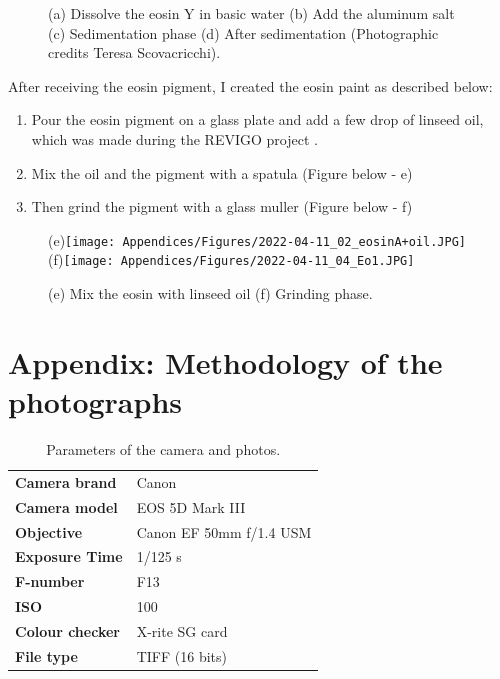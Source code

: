 \begin{appendices}
\begin{figure}[!h]
  \caption*{(a) Dissolve the eosin Y in basic water (b) Add the aluminum salt (c) Sedimentation phase (d) After sedimentation (Photographic credits Teresa Scovacricchi).}
 
\end{figure}


\vspace{1.5cm}

After receiving the eosin pigment, I created the eosin paint as described below:
\begin{enumerate}
\item Pour the eosin pigment on a glass plate and add a few drop of linseed oil, which was made during the \gls{REVIGO} project \citep{geldof_reconstructing_2018}. 
\item Mix the oil and the pigment with a spatula (Figure below - e)
\item Then grind the pigment with a glass muller (Figure below - f)
\end{enumerate} 


\begin{figure}[!h]
  \centering
  
  \subfigure(e){\texttt{[image: Appendices/Figures/2022-04-11\_02\_eosinA+oil.JPG]}} 
  \subfigure(f){\texttt{[image: Appendices/Figures/2022-04-11\_04\_Eo1.JPG]}} 

  \caption*{(e) Mix the eosin with linseed oil (f) Grinding phase.}
\label{fig:eosin_making_paint}
\end{figure}


\newpage
\section[\hspace{0.3cm}Methodology of the photographs]{ Appendix: Methodology of the photographs}
\label{app:ch4_methodology_photos}

\begin{table}[!h]
\centering 
\caption*{Parameters of the camera and photos.}
\begin{tabular}{R{6cm}L{6cm}}
\toprule[0.4mm]
\textbf{Camera brand} & Canon \\
\textbf{Camera model} & EOS 5D Mark III \\
\textbf{Objective} & Canon EF 50mm f/1.4 USM \\
\textbf{Exposure Time} & 1/125 s \\
\textbf{F-number} & F13 \\
\textbf{ISO} & 100 \\
\textbf{Colour checker} & X-rite SG card \\
\textbf{File type} & TIFF (16 bits) \\
\bottomrule[0.4mm]
\end{tabular}
\label{tab:photos_params}
\end{table}


\end{appendices}
